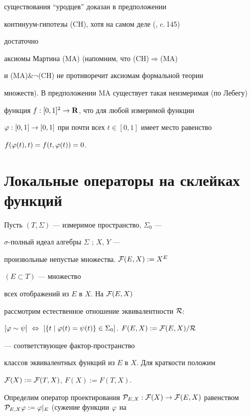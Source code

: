 существования ``уродцев'' доказан в предположении


кон\-ти\-ну\-ум-ги\-по\-те\-зы (CH), хотя на самом деле (\cite{24}, c.\,145)


достаточно


аксиомы Мартина (MA) (напомним, что (CH)$\Rightarrow$(MA)


и (MA)\&$\neg$(CH) не противоречит аксиомам формальной теории


множеств). В предположении MA существует такая неизмеримая (по Лебегу)


функция $f:[0,1]^2\to{{\bold R}}$, что для любой измеримой функции


$\varphi:[0,1]\to[0,1]$ при почти всех $t\in [0,1]$ имеет место равенство


$f(\varphi(t),t)=f(t,\varphi(t))=0$.





\section{Локальные операторы на склейках функций}





Пусть $(T,\Sigma)$ --- измеримое пространство, $\Sigma_0$ ---


$\sigma$-пол\-ный идеал алгебры $\Sigma$ \cite{25}; $X$, $Y$ ---


произвольные непустые множества.\; ${\cal F}(E,X):=X^E$


$(E\subset T)$ --- множество


всех отображений из $E$ в $X$. На ${\cal F}(E,X)$


рассмотрим естественное отношение эквивалентности $\cal R$:


$[\f\sim\psi] \ \Leftrightarrow \


[\{t\mid\f(t)=\psi(t)\}\in\Sigma_0]$.\; $F(E,X):={\cal F}(E,X)/{\cal R}$


--- соответствующее фак\-тор-про\-ст\-ран\-ст\-во


классов эквивалентных функций из $E$ в $X$. Для краткости положим


${\cal F}(X):={\cal F}(T,X)$, $F(X):= F(T,X)$.





Определим оператор проектирования ${\cal P}_{E,X}:{\cal F}(X)\to {\cal


F}(E,X)$ равенством ${\cal P}_{E,X}\f:=\f|_E$ (сужение функции $\f$ на


